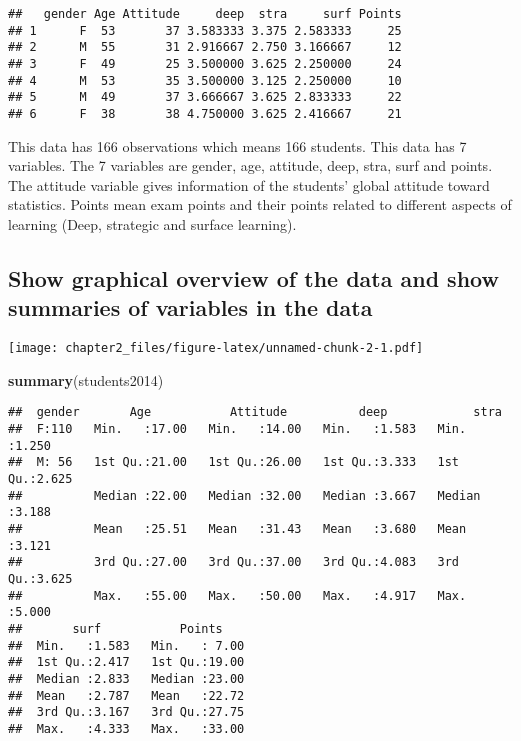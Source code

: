\documentclass[]{article}
\newenvironment{Shaded}{\begin{snugshade}}{\end{snugshade}}
\newcommand{\DataTypeTok}[1]{\textcolor[rgb]{0.13,0.29,0.53}{#1}}
\newcommand{\DecValTok}[1]{\textcolor[rgb]{0.00,0.00,0.81}{#1}}
\newcommand{\KeywordTok}[1]{\textcolor[rgb]{0.13,0.29,0.53}{\textbf{#1}}}
\newcommand{\NormalTok}[1]{#1}
\newcommand{\OperatorTok}[1]{\textcolor[rgb]{0.81,0.36,0.00}{\textbf{#1}}}
\begin{document}
\begin{verbatim}
##   gender Age Attitude     deep  stra     surf Points
## 1      F  53       37 3.583333 3.375 2.583333     25
## 2      M  55       31 2.916667 2.750 3.166667     12
## 3      F  49       25 3.500000 3.625 2.250000     24
## 4      M  53       35 3.500000 3.125 2.250000     10
## 5      M  49       37 3.666667 3.625 2.833333     22
## 6      F  38       38 4.750000 3.625 2.416667     21
\end{verbatim}

This data has 166 observations which means 166 students. This data has 7
variables. The 7 variables are gender, age, attitude, deep, stra, surf
and points. The attitude variable gives information of the students'
global attitude toward statistics. Points mean exam points and their
points related to different aspects of learning (Deep, strategic and
surface learning).

\hypertarget{show-graphical-overview-of-the-data-and-show-summaries-of-variables-in-the-data}{%
\subsection{Show graphical overview of the data and show summaries of
variables in the
data}\label{show-graphical-overview-of-the-data-and-show-summaries-of-variables-in-the-data}}

\begin{Shaded}
\end{Shaded}

\texttt{[image: chapter2\_files/figure-latex/unnamed-chunk-2-1.pdf]}

\begin{Shaded}
\begin{Highlighting}[]
\KeywordTok{summary}\NormalTok{(students2014)}
\end{Highlighting}
\end{Shaded}

\begin{verbatim}
##  gender       Age           Attitude          deep            stra      
##  F:110   Min.   :17.00   Min.   :14.00   Min.   :1.583   Min.   :1.250  
##  M: 56   1st Qu.:21.00   1st Qu.:26.00   1st Qu.:3.333   1st Qu.:2.625  
##          Median :22.00   Median :32.00   Median :3.667   Median :3.188  
##          Mean   :25.51   Mean   :31.43   Mean   :3.680   Mean   :3.121  
##          3rd Qu.:27.00   3rd Qu.:37.00   3rd Qu.:4.083   3rd Qu.:3.625  
##          Max.   :55.00   Max.   :50.00   Max.   :4.917   Max.   :5.000  
##       surf           Points     
##  Min.   :1.583   Min.   : 7.00  
##  1st Qu.:2.417   1st Qu.:19.00  
##  Median :2.833   Median :23.00  
##  Mean   :2.787   Mean   :22.72  
##  3rd Qu.:3.167   3rd Qu.:27.75  
##  Max.   :4.333   Max.   :33.00
\end{verbatim}
\end{document}
